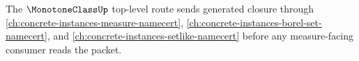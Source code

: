 The $\MonotoneClassUp$ top-level route sends generated closure through \autoref{ch:concrete-instances-measure-namecert}, \autoref{ch:concrete-instances-borel-set-namecert}, and \autoref{ch:concrete-instances-setlike-namecert} before any measure-facing consumer reads the packet.




